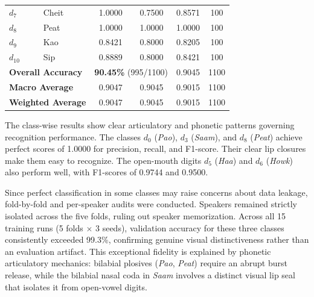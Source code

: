 \documentclass[journal]{IEEEtran}
\begin{document}
\begin{table}[!htbp]
\begin{tabular}{llcccc}
        $d_7$                                         & Cheit                                           & 1.0000             & 0.7500          & 0.8571            & 100              \\
        $d_8$                                         & Peat                                            & 1.0000             & 1.0000          & 1.0000            & 100              \\
        $d_9$                                         & Kao                                             & 0.8421             & 0.8000          & 0.8205            & 100              \\
        $d_{10}$                                      & Sip                                             & 0.8889             & 0.8000          & 0.8421            & 100              \\
        \hline
        \multicolumn{2}{l}{\textbf{Overall Accuracy}} & \multicolumn{2}{c}{\textbf{90.45\%} (995/1100)} & 0.9045             & 1100                                                   \\
        \multicolumn{2}{l}{\textbf{Macro Average}}    & 0.9047                                          & 0.9045             & 0.9015          & 1100                                 \\
        \multicolumn{2}{l}{\textbf{Weighted Average}} & 0.9047                                          & 0.9045             & 0.9015          & 1100                                 \\
        \hline
    \end{tabular}
\end{table}

The class-wise results show clear articulatory and phonetic patterns governing recognition performance. The classes $d_0$ (\textit{Pao}), $d_3$ (\textit{Saam}), and $d_8$ (\textit{Peat}) achieve perfect scores of 1.0000 for precision, recall, and F1-score. Their clear lip closures make them easy to recognize. The open-mouth digits $d_5$ (\textit{Haa}) and $d_6$ (\textit{Howk}) also perform well, with F1-scores of 0.9744 and 0.9500.

Since perfect classification in some classes may raise concerns about data leakage, fold-by-fold and per-speaker audits were conducted. Speakers remained strictly isolated across the five folds, ruling out speaker memorization. Across all 15 training runs (5 folds $\times$ 3 seeds), validation accuracy for these three classes consistently exceeded 99.3\%, confirming genuine visual distinctiveness rather than an evaluation artifact. This exceptional fidelity is explained by phonetic articulatory mechanics: bilabial plosives (\textit{Pao}, \textit{Peat}) require an abrupt burst release, while the bilabial nasal coda in \textit{Saam} involves a distinct visual lip seal that isolates it from open-vowel digits.
\end{document}
